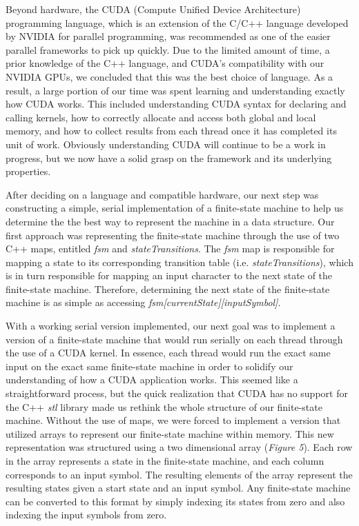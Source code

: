 \documentclass[11pt]{sigplanconf}
\begin{document}
Beyond hardware, the CUDA (Compute Unified Device Architecture) programming language, which is an extension of the C/C++ language developed by NVIDIA for parallel programming, was recommended as one of the easier parallel frameworks to pick up quickly. Due to the limited amount of time, a prior knowledge of the C++ language, and CUDA's compatibility with our NVIDIA GPUs, we concluded that this was the best choice of language. As a result, a large portion of our time was spent learning and understanding exactly how CUDA works. This included understanding CUDA syntax for declaring and calling kernels, how to correctly allocate and access both global and local memory, and how to collect results from each thread once it has completed its unit of work. Obviously understanding CUDA will continue to be a work in progress, but we now have a solid grasp on the framework and its underlying properties.

After deciding on a language and compatible hardware, our next step was constructing a simple, serial implementation of a finite-state machine to help us determine the the best way to represent the machine in a data structure. Our first approach was representing the finite-state machine through the use of two C++ maps, entitled \textit{fsm} and \textit{stateTransitions}. The \textit{fsm} map is responsible for mapping a state to its corresponding transition table (i.e. \textit{stateTransitions}), which is in turn responsible for mapping an input character to the next state of the finite-state machine. Therefore, determining the next state of the finite-state machine is as simple as accessing \textit{fsm[currentState][inputSymbol]}. 

With a working serial version implemented, our next goal was to implement a version of a finite-state machine that would run serially on each thread through the use of a CUDA kernel. In essence, each thread would run the exact same input on the exact same finite-state machine in order to solidify our understanding of how a CUDA application works. This seemed like a straightforward process, but the quick realization that CUDA has no support for the C++ \textit{stl} library made us rethink the whole structure of our finite-state machine. Without the use of maps, we were forced to implement a version that utilized arrays to represent our finite-state machine within memory. This new representation was structured using a two dimensional array (\textit{Figure 5}). Each row in the array represents a state in the finite-state machine, and each column corresponds to an input symbol. The resulting elements of the array represent the resulting states given a start state and an input symbol. Any finite-state machine can be converted to this format by simply indexing its states from zero and also indexing the input symbols from zero.
\end{document}

